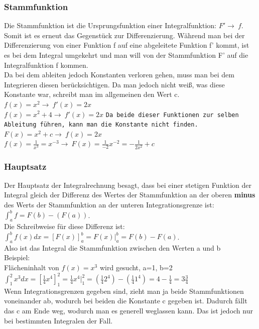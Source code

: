 \documentclass{article}
\begin{document}
	\subsubsection{Stammfunktion}
	Die Stammfunktion ist die Ursprungsfunktion einer Integralfunktion: $F'\to\ f$. Somit ist es erneut das Gegenstück zur Differenzierung. Während man bei der Differenzierung von einer Funktion f auf eine abgeleitete Funktion f' kommt, ist es bei dem Integral umgekehrt und man will von der Stammfunktion F' auf die Integralfunktion f kommen. \\
	Da bei dem ableiten jedoch Konstanten verloren gehen, muss man bei dem Integrieren diesen berücksichtigen. Da man jedoch nicht weiß, was diese Konstante war, schreibt man im allgemeinen den Wert c. \\
	$f(x)=x^2\to\ f'(x)=2x$ \\
	$f(x)=x^2+4\to\ f'(x)=2x$ \verb|Da beide dieser Funktionen zur selben Ableitung führen, kann man die Konstante nicht finden.|\\
	$F(x)=x^2+c\to\ f(x)=2x$ \\
	$f(x)=\frac{1}{x^3}=x^{-3}\to\ F(x)=\frac{1}{-2}x^{-2}=-\frac{1}{2x^2}+c$ \\
	\subsubsection{Hauptsatz}
	Der Hauptsatz der Integralrechnung besagt, dass bei einer stetigen Funktion der Integral gleich der Differenz des Wertes der Stammfunktion an der oberen \textbf{minus} des Werts der Stammfunktion an der unteren Integrationsgrenze ist: $\int_{a}^{b}f=F(b)-(F(a))$. \\
	Die Schreibweise für diese Differenz ist: $\int_{a}^{b}f(x)dx=[F(x)]^b_a=F(x)|^b_a=F(b)-F(a)$. \\
	Also ist das Integral die Stammfunktion zwischen den Werten a und b \\
	Beispiel: \\
	Flächeninhalt von $f(x)=x^3$ wird gesucht, a=1, b=2 \\
	$\int_{1}^{2}x^3dx=[\frac{1}{4}x^4]^2_1=\frac{1}{4}x^4|^2_1=(\frac{1}{4}2^4)-(\frac{1}{4}1^4)=4-\frac{1}{4}=3\frac{3}{4}$ \\
	Wenn Integrationsgrenzen gegeben sind, zieht man ja beide Stammfunktionen voneinander ab, wodurch bei beiden die Konstante c gegeben ist. Dadurch fällt das c am Ende weg, wodurch man es generell weglassen kann. Das ist jedoch nur bei bestimmten Integralen der Fall.
\end{document}
